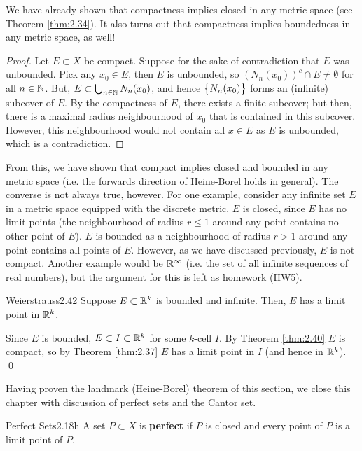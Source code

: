 \noindent We have already shown that compactness implies closed in any metric space (see Theorem \ref{thm:2.34}). It also turns out that compactness implies boundedness in any metric space, as well!
\begin{proof}
    Let $E \subset X$ be compact. Suppose for the sake of contradiction that $E$ was unbounded. Pick any $x_0 \in E$, then $E$ is unbounded, so $\left(N_n(x_0)\right)^c \cap E \neq \emptyset$ for all $n \in \mathbb{N}$. But, $E \subset \bigcup_{n \in \mathbb{N}} N_n(x_0)$, and hence $\set{N_n(x_0)}$ forms an (infinite) subcover of $E$. By the compactness of $E$, there exists a finite subcover; but then, there is a maximal radius neighbourhood of $x_0$ that is contained in this subcover. However, this neighbourhood would not contain all $x \in E$ as $E$ is unbounded, which is a contradiction.
\end{proof}
\noindent From this, we have shown that compact implies closed and bounded in any metric space (i.e. the forwards direction of Heine-Borel holds in general). The converse is not always true, however. For one example, consider any infinite set $E$ in a metric space equipped with the discrete metric. $E$ is closed, since $E$ has no limit points (the neighbourhood of radius $r \leq 1$ around any point contains no other point of $E$). $E$ is bounded as a neighbourhood of radius $r > 1$ around any point contains all points of $E$. However, as we have discussed previously, $E$ is not compact. Another example would be $\mathbb{R}^\infty$ (i.e. the set of all infinite sequences of real numbers), but the argument for this is left as homework (HW5). 


\begin{theorem}{Weierstrauss}{2.42}
    Suppose $E \subset \mathbb{R}^k$ is bounded and infinite. Then, $E$ has a limit point in $\mathbb{R}^k$.
\end{theorem}
\begin{nproof}
    Since $E$ is bounded, $E \subset I \subset \mathbb{R}^k$ for some $k$-cell $I$. By Theorem \ref{thm:2.40} $E$ is compact, so by Theorem \ref{thm:2.37} $E$ has a limit point in $I$ (and hence in $\mathbb{R}^k$). \qed
\end{nproof}

\noindent Having proven the landmark (Heine-Borel) theorem of this section, we close this chapter with discussion of perfect sets and the Cantor set.
\setcounter{rudin}{17}
\begin{definition}{Perfect Sets}{2.18h}
    A set $P \subset X$ is \textbf{perfect} if $P$ is closed and every point of $P$ is a limit point of $P$. 
\end{definition}


